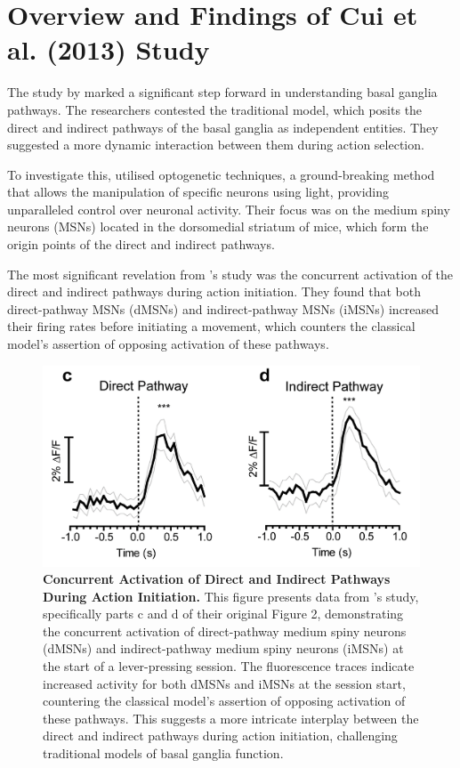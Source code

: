 \documentclass[10pt]{article}
\begin{document}
\begin{sloppypar}
  \section{Overview and Findings of Cui et al. (2013) Study}
  \label{sec:cui-et-al-2013}

  The study by \cite{cui_concurrent_2013} marked a significant step forward in understanding basal ganglia pathways. The researchers contested the traditional model, which posits the direct and indirect pathways of the basal ganglia as independent entities. They suggested a more dynamic interaction between them during action selection.

  To investigate this, \citeauthor{cui_concurrent_2013} utilised optogenetic techniques, a ground-breaking method that allows the manipulation of specific neurons using light, providing unparalleled control over neuronal activity. Their focus was on the medium spiny neurons (MSNs) located in the dorsomedial striatum of mice, which form the origin points of the direct and indirect pathways.

  The most significant revelation from \citeauthor{cui_concurrent_2013}’s study was the concurrent activation of the direct and indirect pathways during action initiation. They found that both direct-pathway MSNs (dMSNs) and indirect-pathway MSNs (iMSNs) increased their firing rates before initiating a movement, which counters the classical model’s assertion of opposing activation of these pathways.

  \begin{figure}[ht]
    \centering
    \includegraphics[width=\textwidth]{figures/direct-indirect-activation.png}
    \caption[Concurrent Activation of Direct and Indirect Pathways During Action Initiation]{\textbf{Concurrent Activation of Direct and Indirect Pathways During Action Initiation.} This figure presents data from \cite{cui_concurrent_2013}’s study, specifically parts c and d of their original Figure 2, demonstrating the concurrent activation of direct-pathway medium spiny neurons (dMSNs) and indirect-pathway medium spiny neurons (iMSNs) at the start of a lever-pressing session. The fluorescence traces indicate increased activity for both dMSNs and iMSNs at the session start, countering the classical model’s assertion of opposing activation of these pathways. This suggests a more intricate interplay between the direct and indirect pathways during action initiation, challenging traditional models of basal ganglia function.}
    \label{fig:q-les}
  \end{figure}


\end{sloppypar}
\end{document}
